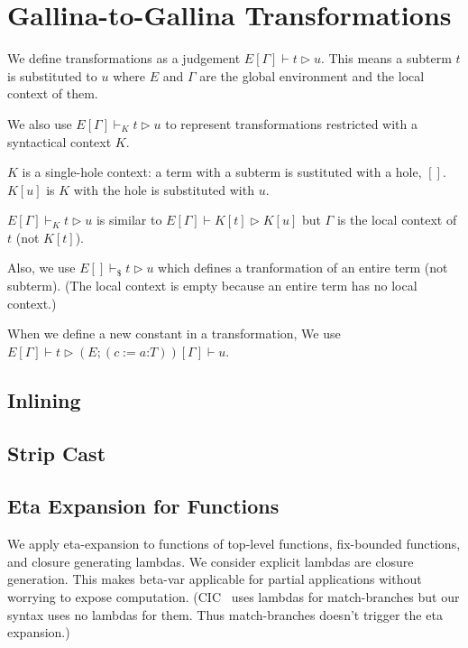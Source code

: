 \documentclass[a4paper,fleqn]{article}
\def\gallina{\textrm{Gallina}}
\newcommand{\glodef}[3]{(#1:=#2\mathord{:}#3)}
\newcommand{\reltri}{\mathrel{\triangleright}}
\begin{document}
\section{\gallina-to-\gallina{} Transformations}\label{sec:gallina-to-gallina-transformations}

We define transformations as a judgement $E[\Gamma] \vdash t \reltri u$.
This means a subterm $t$ is substituted to $u$ where
$E$ and $\Gamma$ are the global environment and the local context of them.

We also use $E[\Gamma] \vdash_K t \reltri u$ to represent transformations restricted with a syntactical context $K$.

$K$ is a single-hole context: a term with a subterm is sustituted with a hole, $[]$.
$K[u]$ is $K$ with the hole is substituted with $u$.

$E[\Gamma] \vdash_K t \reltri u$ is similar to $E[\Gamma] \vdash K[t] \reltri K[u]$ but
$\Gamma$ is the local context of $t$ (not $K[t]$).

Also, we use $E[] \vdash_\$ t \reltri u$ which defines a tranformation of an entire term (not subterm).
(The local context is empty because an entire term has no local context.)

When we define a new constant in a transformation,
We use $E[\Gamma] \vdash t \reltri (E;\glodef{c}{a}{T})[\Gamma] \vdash u$.

\subsection{Inlining}\label{sec:inlining}
\subsection{Strip Cast}\label{sec:strip-cast}
\subsection{Eta Expansion for Functions}\label{sec:eta-expand-funcs}
We apply eta-expansion to functions of top-level functions, fix-bounded functions, and closure generating lambdas.
We consider explicit lambdas are closure generation.
This makes beta-var applicable for partial applications without worrying to expose computation.
(CIC~\cite{coqrefman8.12.0} uses lambdas for match-branches but our syntax uses no lambdas for them.
Thus match-branches doesn't trigger the eta expansion.)
\end{document}

